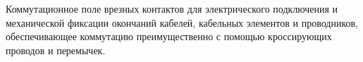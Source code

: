 Коммутационное поле врезных контактов для электрического
подключения и механической фиксации окончаний кабелей,
кабельных элементов и проводников, обеспечивающее
коммутацию преимущественно с помощью кроссирующих 
проводов и перемычек.